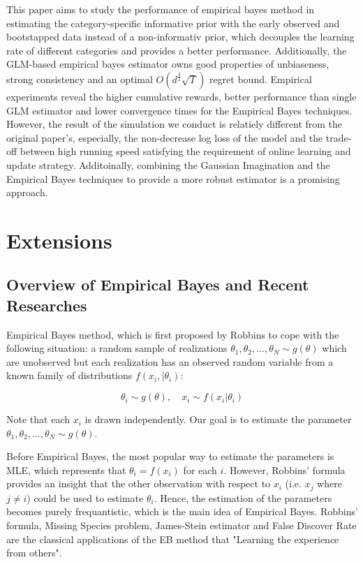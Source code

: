 \documentclass{article}
\begin{document}
This paper aims to study the performance of empirical bayes method in estimating the category-specific informative prior with the early observed and bootstapped data instead of a non-informativ prior, which decouples the learning rate of different categories and provides a better performance. Additionally, the GLM-based empirical bayes estimator owns good properties of unbiaseness, strong consistency and an optimal $O(d^{\frac{3}{2}} \sqrt{T})$ regret bound. Empirical experiments reveal the higher cumulative rewards, better performance than single GLM estimator and lower convergence times for the Empirical Bayes techniques. However, the result of the simulation we conduct is relatiely different from the original paper's, especially, the non-decrease log loss of the model and the trade-off between high running speed satisfying the requirement of online learning and update strategy. Additoinally, combining the Gaussian Imagination and the Empirical Bayes techniques to provide a more robust estimator is a promising approach.

\section{Extensions}
\subsection{Overview of Empirical Bayes and Recent Researches}

Empirical Bayes method, which is first proposed by Robbins \cite{EB} to cope with the following situation: a random sample of realizations $\theta_1,\theta_2,...,\theta_N \sim g(\theta)$ which are unobserved but each realization has an observed random variable from a known family of distributions $f(x_i,|\theta_i)$:

\begin{equation}
  \theta_i \sim g(\theta), \quad x_i \sim f(x_i|\theta_i)
\end{equation}

Note that each $x_i$ is drawn independently. Our goal is to estimate the parameter $\theta_1,\theta_2,...,\theta_N \sim g(\theta)$.

Before Empirical Bayes, the most popular way to estimate the parameters is MLE, which represents that $\theta_i = f(x_i)$ for each $i$. However, Robbins' formula provides an insight that the other observation with respect to $x_i$ (i.e. $x_j$ where $j \neq i$) could be used to estimate $\theta_i$. Hence, the estimation of the parameters becomes purely frequantistic, which is the main idea of Empirical Bayes. Robbins' formula, Missing Species problem, James-Stein estimator and False Discover Rate are the classical applications of the EB method that "Learning the experience from others".
\end{document}
